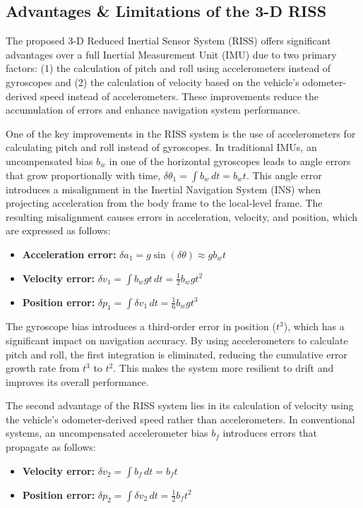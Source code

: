 \documentclass[conference]{IEEEtran}
\begin{document}
\subsection{Advantages \& Limitations of the 3-D RISS}

The proposed 3-D Reduced Inertial Sensor System (RISS) offers significant advantages over a full Inertial Measurement Unit (IMU) due to two primary factors: (1) the calculation of pitch and roll using accelerometers instead of gyroscopes and (2) the calculation of velocity based on the vehicle’s odometer-derived speed instead of accelerometers. These improvements reduce the accumulation of errors and enhance navigation system performance.

One of the key improvements in the RISS system is the use of accelerometers for calculating pitch and roll instead of gyroscopes. In traditional IMUs, an uncompensated bias $b_w$ in one of the horizontal gyroscopes leads to angle errors that grow proportionally with time, $\delta \theta_1 = \int b_w \, dt = b_w t$. This angle error introduces a misalignment in the Inertial Navigation System (INS) when projecting acceleration from the body frame to the local-level frame. The resulting misalignment causes errors in acceleration, velocity, and position, which are expressed as follows:
\begin{itemize}
    \item \textbf{Acceleration error:} $\delta a_1 = g \sin(\delta \theta) \approx g b_w t$
    \item \textbf{Velocity error:} $\delta v_1 = \int b_w g t \, dt = \frac{1}{2} b_w g t^2$
    \item \textbf{Position error:} $\delta p_1 = \int \delta v_1 \, dt = \frac{1}{6} b_w g t^3$
\end{itemize}

The gyroscope bias introduces a third-order error in position ($t^3$), which has a significant impact on navigation accuracy. By using accelerometers to calculate pitch and roll, the first integration is eliminated, reducing the cumulative error growth rate from $t^3$ to $t^2$. This makes the system more resilient to drift and improves its overall performance.

The second advantage of the RISS system lies in its calculation of velocity using the vehicle’s odometer-derived speed rather than accelerometers. In conventional systems, an uncompensated accelerometer bias $b_f$ introduces errors that propagate as follows:
\begin{itemize}
    \item \textbf{Velocity error:} $\delta v_2 = \int b_f \, dt = b_f t$
    \item \textbf{Position error:} $\delta p_2 = \int \delta v_2 \, dt = \frac{1}{2} b_f t^2$
\end{itemize}
\end{document}
